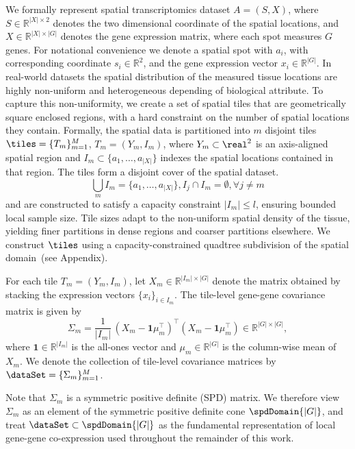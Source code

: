 \documentclass[pdflatex,sn-mathphys-num]{sn-jnl}%
\theoremstyle{thmstyleone}%
\theoremstyle{thmstyletwo}%
\theoremstyle{thmstylethree}%
\begin{document}
We formally represent spatial transcriptomics dataset $A=(S,X)$, where $S\in\mathbb{R}^{|X|\times 2}$ denotes the two dimensional coordinate of the spatial locations, and $X\in\mathbb{R}^{|X|\times|G|}$ denotes the gene expression matrix, where each spot measures $G$ genes. For notational convenience we denote a spatial spot with $a_i$, with corresponding coordinate $s_i \in \mathbb{R}^2$, and the gene expression vector $x_i \in \mathbb{R}^{|G|}$. In real-world datasets the spatial distribution of the measured tissue locations are highly non-uniform and heterogeneous depending of biological attribute. To capture this non-uniformity, we create a set of spatial tiles that are geometrically square enclosed regions, with a hard constraint on the number of spatial locations they contain. Formally, the spatial data is partitioned into $m$ disjoint tiles $\tiles = \{T_m\}_{m=1}^{M}$, $T_m = (Y_m, I_m)$, where $Y_m \subset \real^{2}$ is an axis-aligned spatial region and $I_m\subset \{a_1,\ldots,a_{|X|} \}$ indexes the spatial locations contained in that region. The tiles form a disjoint cover of the spatial dataset. 
\begin{equation}
    \bigcup_{m} I_m = \{a_1,\ldots,a_{|X|}\}, \xspace I_j \cap I_m = \emptyset, \forall j \neq m
\end{equation}
and are constructed to satisfy a capacity constraint $|I_m| \leq l$, ensuring bounded local sample size. Tile sizes adapt to the non-uniform spatial density of the tissue, yielding finer partitions in dense regions and coarser partitions elsewhere. We construct $\tiles$ using a capacity-constrained quadtree subdivision of the spatial domain~(see Appendix). 

For each tile $T_m=(Y_m,I_m)$, let $X_m \in \mathbb{R}^{|I_m|\times |G|}$ denote the matrix obtained by stacking the expression vectors $\{x_i\}_{i\in I_m}$. The tile-level gene-gene covariance matrix is given by
\begin{equation}
\Sigma_m = \frac{1}{|I_m|}\,(X_m - \mathbf{1}\mu_m^{\top})^{\top}(X_m - \mathbf{1}\mu_m^{\top})
\in \mathbb{R}^{|G|\times |G|},
\end{equation}
where $\mathbf{1}\in\mathbb{R}^{|I_m|}$ is the all-ones vector and $\mu_m \in \mathbb{R}^{|G|}$ is the column-wise mean of $X_m$.
We denote the collection of tile-level covariance matrices by $\dataSet=\{\Sigma_m\}_{m=1}^M$.

Note that $\Sigma_m$ is a symmetric positive definite (SPD) matrix. We therefore view $\Sigma_m$ as an element of the symmetric positive definite cone $\spdDomain{|G|}$, and treat $\dataSet\subset \spdDomain{|G|}$ as the fundamental representation of local gene-gene co-expression used throughout the remainder of this work.
\end{document}
